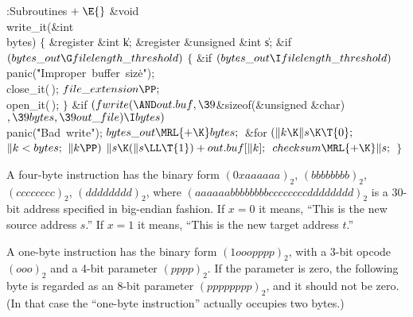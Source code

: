 \B{}:Subroutines\X${}\mathrel+\E{}$\6
\&{void} \\{write\_it}(\&{int} \\{bytes})\1\1\2\2\6
${}\{{}$\1\6
\&{register} \&{int} \|k;\6
\&{register} \&{unsigned} \&{int} \|s;\7
\&{if} ${}(\\{bytes\_out}\G\\{filelength\_threshold}){}$\5
${}\{{}$\1\6
\&{if} ${}(\\{bytes\_out}\I\\{filelength\_threshold}){}$\1\5
\\{panic}(\.{"Improper\ buffer\ siz}\)\.{e"});\2\6
\\{close\_it}(\,);\6
${}\\{file\_extension}\PP;{}$\6
\\{open\_it}(\,);\6
\4${}\}{}$\2\6
\&{if} ${}(\\{fwrite}({\AND}\\{out}.\\{buf},\39{}$\&{sizeof}(\&{unsigned} %
\&{char})${},\39\\{bytes},\39\\{out\_file})\I\\{bytes}){}$\1\5
\\{panic}(\.{"Bad\ write"});\2\6
${}\\{bytes\_out}\MRL{+{\K}}\\{bytes};{}$\6
\&{for} ${}(\|k\K\|s\K\T{0};{}$ ${}\|k<\\{bytes};{}$ ${}\|k\PP){}$\1\5
${}\|s\K(\|s\LL\T{1})+\\{out}.\\{buf}[\|k];{}$\2\6
${}\\{checksum}\MRL{+{\K}}\|s;{}$\6
\4${}\}{}$\2\par
\fi

A four-byte instruction has the binary form
$(0xaaaaaa)_2$, $(bbbbbbbb)_2$,
$(cccccccc)_2$, $(dddddddd)_2$, where
$(aaaaaabbbbbbbbccccccccdddddddd)_2$ is a 30-bit address specified
in big-endian fashion.
If $x=0$ it means, ``This is the new source address $s$.''
If $x=1$ it means, ``This is the new target address $t$.''

A one-byte instruction has the binary form $(1ooopppp)_2$, with a 3-bit
opcode $(ooo)_2$ and a 4-bit parameter $(pppp)_2$. If the parameter is zero,
the following byte is regarded as an 8-bit parameter $(pppppppp)_2$, and
it should not be zero. (In that case the ``one-byte instruction'' actually
occupies two bytes.)


